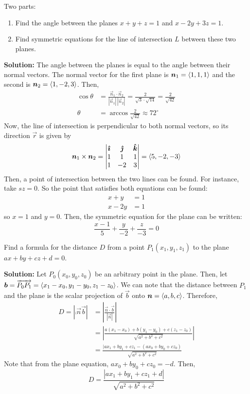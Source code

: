 \begin{example} 
Two parts:
    \begin{enumerate}
        \item Find the angle between the planes \(x+y+z=1\) and \(x-2y+3z=1\).
        \item Find symmetric equations for the line of intersection \(L\) between these two planes.
    \end{enumerate} \par \textbf{Solution:} The angle between the planes is equal to the angle between their normal vectors. The normal vector for the first plane is \(\boldsymbol{n}_1 = \left\langle1,1,1\right\rangle\) and the second is \(\boldsymbol{n}_2 = \left\langle1,-2,3\right\rangle\). Then,
    \begin{align*}
        \cos\theta &= \frac{\vec n_1\cdot \vec n_2}{|\vec n_1|\,|\vec n_2|} = \frac{2}{\sqrt{3}\cdot \sqrt{14}} = \frac{2}{\sqrt{42}} \\
        \theta &= \arccos\frac{2}{\sqrt{42}}\approx 72^\circ
    \end{align*}
    Now, the line of intersection is perpendicular to both normal vectors, so its direction \(\vec r\) is given by
    \[ \boldsymbol{n}_1\times \boldsymbol{n}_2=\begin{vmatrix}
        \boldsymbol{\hat{\imath}} & \boldsymbol{\hat{\jmath}} & \boldsymbol{\hat{k}} \\
        1 & 1 & 1 \\
        1 & -2 & 3
    \end{vmatrix} = \left\langle5, -2, -3\right\rangle \]
    Then, a point of intersection between the two lines can be found. For instance, take \(sz=0\). So the point that satisfies both equations can be found:
    \begin{align*}
        x+y&= 1\\
        x-2y &= 1
    \end{align*}
    so \(x=1\) and \(y=0\). Then, the symmetric equation for the plane can be written:
    \[\frac{x-1}{5}+\frac{y}{-2}+\frac{z}{-3}=0\]
\end{example}
\begin{example}
    Find a formula for the distance \(D\) from a point \(P_1(x_1,y_1,z_1)\) to the plane \(ax+by+cz+d=0\). \par\textbf{Solution: }Let \(P_0(x_0,y_0,z_0)\) be an arbitrary point in the plane. Then, let \(\boldsymbol{b}=\overrightarrow{P_0P_1}=\left\langle x_1-x_0, y_1-y_0,z_1-z_0\right\rangle\). We can note that the distance between \(P_1\) and the plane is the scalar projection of \(\vec b\) onto \(\boldsymbol{n}=\left\langle a,b,c\right\rangle\). Therefore,
    \begin{align*}D = \left|\comp{\vec n}{\vec b}\right| &= \left|\frac{\vec n \cdot \vec b}{|\vec n|}\right| \\
    &= \left|\frac{a(x_1-x_0)+b(y_1-y_0)+c(z_1-z_0)}{\sqrt{a^2+b^2+c^2}}\right| \\
    &= \frac{|ax_1+by_1+cz_1 - (ax_0+by_0+cz_0)}{\sqrt{a^2+b^2+c^2}}
    \end{align*}
    Note that from the plane equation, \(ax_0+by_0+cz_0=-d\). Then,
    \[D = \frac{|ax_1+by_1+cz_1+d|}{\sqrt{a^2+b^2+c^2}}\]
\end{example}
